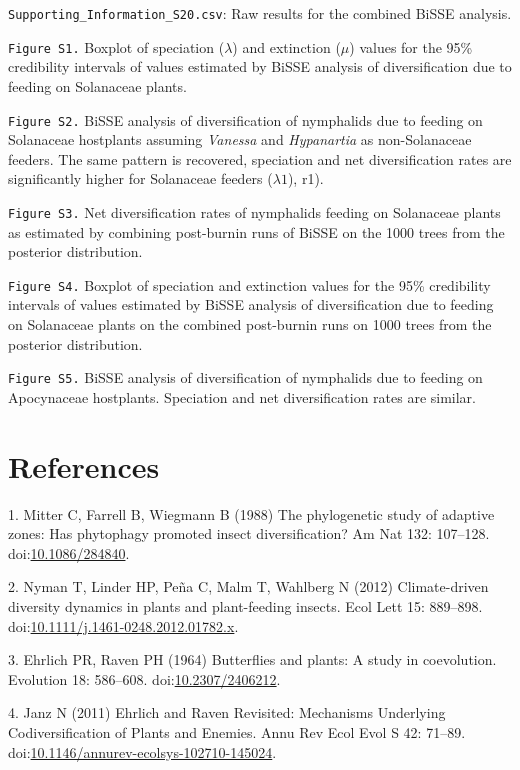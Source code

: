 \documentclass[10pt]{article}
\begin{document}
\texttt{Supporting\_Information\_S20.csv}: Raw results for the combined
BiSSE analysis.

\texttt{Figure S1.} Boxplot of speciation ($\lambda$) and extinction
(\(\mu\)) values for the 95\% credibility intervals of values estimated
by BiSSE analysis of diversification due to feeding on Solanaceae
plants.

\texttt{Figure S2.} BiSSE analysis of diversification of nymphalids due
to feeding on Solanaceae hostplants assuming \emph{Vanessa} and
\emph{Hypanartia} as non-Solanaceae feeders. The same pattern is
recovered, speciation and net diversification rates are significantly
higher for Solanaceae feeders ($\lambda1$), r1).

\texttt{Figure S3.} Net diversification rates of nymphalids feeding on
Solanaceae plants as estimated by combining post-burnin runs of BiSSE on
the 1000 trees from the posterior distribution.

\texttt{Figure S4.} Boxplot of speciation and extinction values for the
95\% credibility intervals of values estimated by BiSSE analysis of
diversification due to feeding on Solanaceae plants on the combined
post-burnin runs on 1000 trees from the posterior distribution.

\texttt{Figure S5.} BiSSE analysis of diversification of nymphalids due
to feeding on Apocynaceae hostplants. Speciation and net diversification
rates are similar.

\section*{References}
1. Mitter C, Farrell B, Wiegmann B (1988) The phylogenetic study of
adaptive zones: Has phytophagy promoted insect diversification? Am Nat
132: 107--128.
doi:\href{http://dx.doi.org/10.1086/284840}{10.1086/284840}.

2. Nyman T, Linder HP, Peña C, Malm T, Wahlberg N (2012) Climate-driven
diversity dynamics in plants and plant-feeding insects. Ecol Lett 15:
889--898.
doi:\href{http://dx.doi.org/10.1111/j.1461-0248.2012.01782.x}{10.1111/j.1461-0248.2012.01782.x}.

3. Ehrlich PR, Raven PH (1964) Butterflies and plants: A study in
coevolution. Evolution 18: 586--608.
doi:\href{http://dx.doi.org/10.2307/2406212}{10.2307/2406212}.

4. Janz N (2011) Ehrlich and Raven Revisited: Mechanisms Underlying
Codiversification of Plants and Enemies. Annu Rev Ecol Evol S 42:
71--89.
doi:\href{http://dx.doi.org/10.1146/annurev-ecolsys-102710-145024}{10.1146/annurev-ecolsys-102710-145024}.
\end{document}

